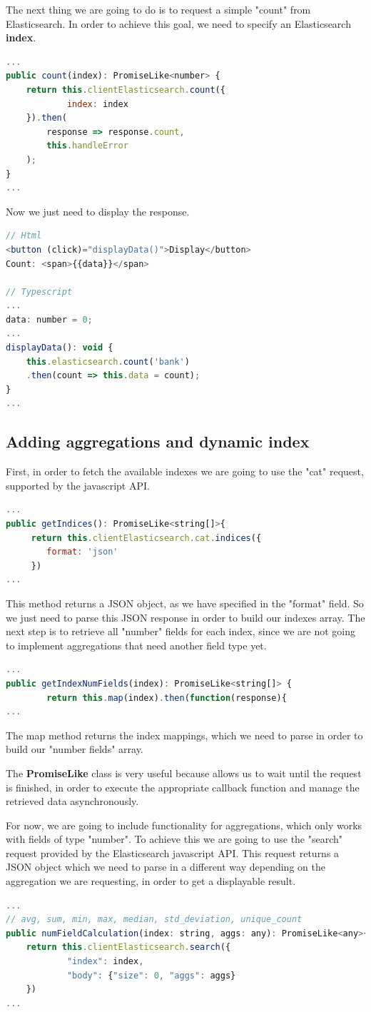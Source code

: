 \documentclass[a4paper, 12pt, english]{book}
\begin{document}
The next thing we are going to do is to request a simple "count" from Elasticsearch. In order to achieve this goal, we need to specify an Elasticsearch \textbf{index}.
\begin{lstlisting}[language=javascript]
...
public count(index): PromiseLike<number> {
	return this.clientElasticsearch.count({
			index: index
	}).then(
		response => response.count,
		this.handleError
	);
}
...
\end{lstlisting}
Now we just need to display the response.
\begin{lstlisting}[language=javascript]
// Html
<button (click)="displayData()">Display</button>
Count: <span>{{data}}</span>

// Typescript
...
data: number = 0;
...
displayData(): void {
	this.elasticsearch.count('bank')
	.then(count => this.data = count);
}
...
\end{lstlisting}


\subsection{Adding aggregations and dynamic index}
\label{sec:adding-aggregations}
First, in order to fetch the available indexes we are going to use the "cat" request, supported by the javascript API.
\begin{lstlisting}[language=javascript]
...
public getIndices(): PromiseLike<string[]>{
     return this.clientElasticsearch.cat.indices({
     	format: 'json'
     })
...
\end{lstlisting}
This method returns a JSON object, as we have specified in the "format" field. So we just need to parse this JSON response in order to build our indexes array. The next step is to retrieve all "number" fields for each index, since we are not going to implement aggregations that need another field type yet.
\begin{lstlisting}[language=javascript]
...
public getIndexNumFields(index): PromiseLike<string[]> {
 		return this.map(index).then(function(response){
...
\end{lstlisting}
The map method returns the index mappings, which we need to parse in order to build our "number fields" array.

The \textbf{PromiseLike} class is very useful because allows us to wait until the request is finished, in order to execute the appropriate callback function and manage the retrieved data asynchronously.

For now, we are going to include functionality for aggregations, which only works with fields of type "number". To achieve this we are going to use the "search" request provided by the Elasticsearch javascript API. This request returns a JSON object which we need to parse in a different way depending on the aggregation we are requesting, in order to get a displayable result.
\begin{lstlisting}[language=javascript]
...
// avg, sum, min, max, median, std_deviation, unique_count
public numFieldCalculation(index: string, aggs: any): PromiseLike<any>{
	return this.clientElasticsearch.search({
			"index": index,
			"body": {"size": 0, "aggs": aggs}
	})
...
\end{lstlisting}
\end{document}
